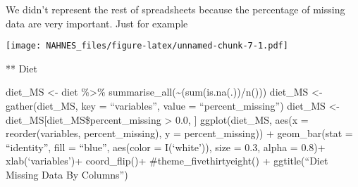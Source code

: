 \documentclass[]{article}
\newenvironment{Shaded}{\begin{snugshade}}{\end{snugshade}}
\newcommand{\CommentTok}[1]{\textcolor[rgb]{0.56,0.35,0.01}{\textit{#1}}}
\newcommand{\DataTypeTok}[1]{\textcolor[rgb]{0.13,0.29,0.53}{#1}}
\newcommand{\FloatTok}[1]{\textcolor[rgb]{0.00,0.00,0.81}{#1}}
\newcommand{\KeywordTok}[1]{\textcolor[rgb]{0.13,0.29,0.53}{\textbf{#1}}}
\newcommand{\NormalTok}[1]{#1}
\newcommand{\OperatorTok}[1]{\textcolor[rgb]{0.81,0.36,0.00}{\textbf{#1}}}
\newcommand{\StringTok}[1]{\textcolor[rgb]{0.31,0.60,0.02}{#1}}
\begin{document}
We didn't represent the rest of spreadsheets because the percentage of
missing data are very important. Just for example

\begin{Shaded}
\end{Shaded}

\texttt{[image: NAHNES\_files/figure-latex/unnamed-chunk-7-1.pdf]}

** Diet

diet\_MS \textless- diet \%\textgreater\%
summarise\_all(\textasciitilde(sum(is.na(.))/n())) diet\_MS \textless-
gather(diet\_MS, key = ``variables'', value = ``percent\_missing'')
diet\_MS \textless- diet\_MS{[}diet\_MS\$percent\_missing \textgreater{}
0.0, {]} ggplot(diet\_MS, aes(x = reorder(variables, percent\_missing),
y = percent\_missing)) + geom\_bar(stat = ``identity'', fill = ``blue'',
aes(color = I(`white')), size = 0.3, alpha = 0.8)+ xlab(`variables')+
coord\_flip()+ \#theme\_fivethirtyeight() + ggtitle(``Diet Missing Data
By Columns'')
\end{document}
